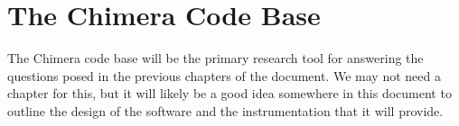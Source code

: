 \chapter{The Chimera Code Base}
\label{ch:chimera_codebase}

The Chimera code base will be the primary research tool for answering
the questions posed in the previous chapters of the document. We may
not need a chapter for this, but it will likely be a good idea
somewhere in this document to outline the design of the software and
the instrumentation that it will provide.
